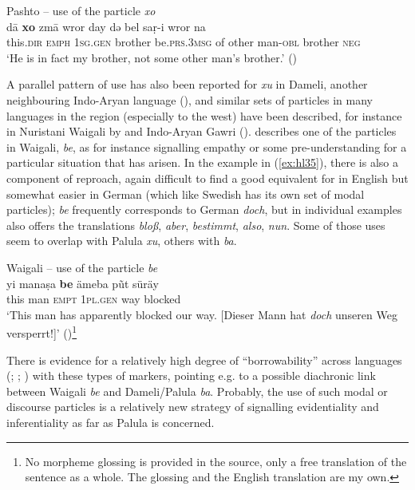 \documentclass[output=paper]{langsci/langscibook}
\begin{document}
\begin{exe}
\ex Pashto -- use of the particle \textit{xo} \label{ex:hl34}\\
	\gll dā \textbf{xo} zmā wror day də bel saṛ-i wror na\\
	this.\textsc{dir} \textsc{emph} 1\textsc{sg}.\textsc{gen} brother be.\textsc{prs}.3\textsc{msg} of other man-\textsc{obl} brother \textsc{neg}\\
	\trans ‘He is in fact my brother, not some other man’s brother.’ (\citealt[375]{David2013})
\end{exe}

A parallel pattern of use has also been reported for \textit{xu} in Dameli, another neighbouring Indo-Aryan language (\citealt[168]{Perder2013}), and similar sets of particles in many languages in the region (especially to the west) have been described, for instance in Nuristani Waigali by \cite[166--188]{Degener1998} and Indo-Aryan Gawri (\citealt[159--166]{Baart1999}). \citeauthor{Degener1998} describes one of the particles in Waigali, \textit{be}, as for instance signalling empathy or some pre-understanding for a particular situation that has arisen. In the example in ‎(\ref{ex:hl35}), there is also a component of reproach, again difficult to find a good equivalent for in English but somewhat easier in German (which like Swedish has its own set of modal particles); \textit{be} frequently corresponds to German \textit{doch}, but in individual examples \citeauthor{Degener1998} also offers the translations \textit{bloß}, \textit{aber}, \textit{bestimmt}, \textit{also}, \textit{nun}.  Some of those uses seem to overlap with Palula \textit{xu}, others with \textit{ba}.

\largerpage[1.5]
\begin{exe}
\ex Waigali -- use of the particle \textit{be} \label{ex:hl35}\\
	\gll yi manaṣa \textbf{be} ämeba pũt süräy\\
	this man \textsc{empt} 1\textsc{pl}.\textsc{gen} way blocked\\
	\trans ‘This man has apparently blocked our way. [Dieser Mann hat \textit{doch} unseren Weg versperrt!]’ (\citealt[167]{Degener1998})\footnote{No morpheme glossing is provided in the source, only a free translation of the sentence as a whole. The glossing and the English translation are my own.}
\end{exe}
\clearpage

There is evidence for a relatively high degree of “borrowability” across languages (\citealt{Svard2014}; \citealt{LiljegrenSvard2017}; \citealt[183–184]{Perder2013}) with these types of markers, pointing e.g. to a possible diachronic link between Waigali \textit{be} and Dameli/Palula \textit{ba}. Probably, the use of such modal or discourse particles is a relatively new strategy of signalling evidentiality and inferentiality as far as Palula is concerned.
\end{document}
